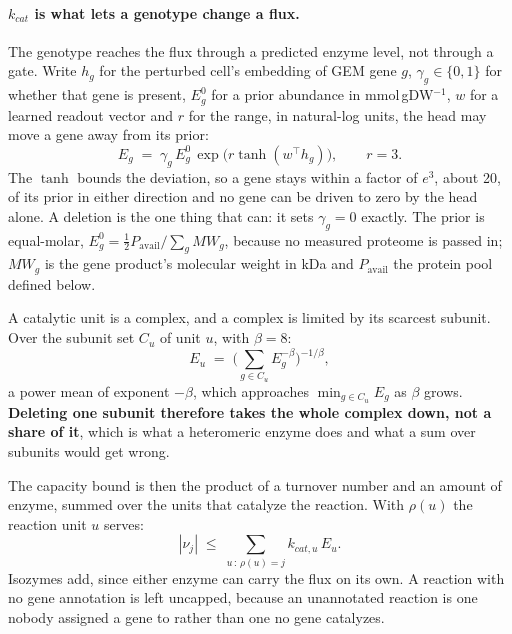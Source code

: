 \paragraph{$k_{cat}$ is what lets a genotype change a flux.} The genotype reaches the flux
through a predicted enzyme level, not through a gate. Write $h_g$ for the perturbed cell's
embedding of GEM gene $g$, $\gamma_g \in \{0,1\}$ for whether that gene is present,
$E^0_g$ for a prior abundance in mmol\,gDW$^{-1}$, $w$ for a learned readout vector and $r$
for the range, in natural-log units, the head may move a gene away from its prior:
\begin{equation}
  E_g \;=\; \gamma_g\,E^0_g\,\exp\!\big(r\tanh(w^{\!\top}h_g)\big),
  \qquad r = 3 .
  \label{eq:abundance}
\end{equation}
The $\tanh$ bounds the deviation, so a gene stays within a factor of $e^{3}$, about 20, of
its prior in either direction and no gene can be driven to zero by the head alone. A
deletion is the one thing that can: it sets $\gamma_g = 0$ exactly. The prior is
equal-molar, $E^0_g = \tfrac{1}{2}P_{\mathrm{avail}}/\sum_g MW_g$, because no measured
proteome is passed in; $MW_g$ is the gene product's molecular weight in kDa and
$P_{\mathrm{avail}}$ the protein pool defined below.

A catalytic unit is a complex, and a complex is limited by its scarcest subunit. Over the
subunit set $C_u$ of unit $u$, with $\beta = 8$:
\begin{equation}
  E_u \;=\; \Big(\sum_{g\in C_u} E_g^{-\beta}\Big)^{-1/\beta},
  \label{eq:complex}
\end{equation}
a power mean of exponent $-\beta$, which approaches $\min_{g\in C_u} E_g$ as $\beta$ grows.
\textbf{Deleting one subunit therefore takes the whole complex down, not a share of it},
which is what a heteromeric enzyme does and what a sum over subunits would get wrong.

The capacity bound is then the product of a turnover number and an amount of enzyme, summed
over the units that catalyze the reaction. With $\rho(u)$ the reaction unit $u$ serves:
\begin{equation}
  |\nu_j| \;\le\; \sum_{u\,:\,\rho(u)=j} k_{cat,u}\,E_u .
  \label{eq:capacity}
\end{equation}
Isozymes add, since either enzyme can carry the flux on its own. A reaction with no gene
annotation is left uncapped, because an unannotated reaction is one nobody assigned a gene
to rather than one no gene catalyzes.

